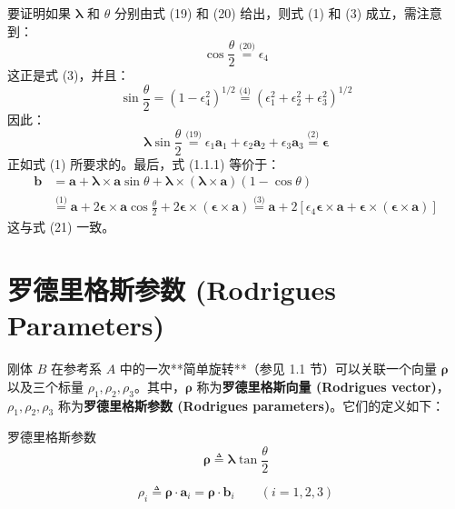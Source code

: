要证明如果 \(\boldsymbol{\lambda}\) 和 \(\theta\) 分别由式 (19) 和 (20) 给出，则式 (1) 和 (3) 成立，需注意到：
\begin{equation}
\cos\frac{\theta}{2} \overset{\text{(20)}}{=} \epsilon_4 \tag{30}
\end{equation}
这正是式 (3)，并且：
\begin{equation}
\sin\frac{\theta}{2} = (1 - \epsilon_4^2)^{1/2} \overset{\text{(4)}}{=} (\epsilon_1^2 + \epsilon_2^2 + \epsilon_3^2)^{1/2} \tag{31}
\end{equation}
因此：
\begin{equation}
\boldsymbol{\lambda} \sin\frac{\theta}{2} \overset{\text{(19)}}{=} \epsilon_1 \mathbf{a}_1 + \epsilon_2 \mathbf{a}_2 + \epsilon_3 \mathbf{a}_3 \overset{\text{(2)}}{=} \boldsymbol{\epsilon} \tag{32}
\end{equation}
正如式 (1) 所要求的。最后，式 (1.1.1) 等价于：
\begin{align}
\mathbf{b} &= \mathbf{a} + \boldsymbol{\lambda} \times \mathbf{a} \sin\theta + \boldsymbol{\lambda} \times (\boldsymbol{\lambda} \times \mathbf{a})(1 - \cos\theta) \nonumber \\
&\overset{\text{(1)}}{=} \mathbf{a} + 2\boldsymbol{\epsilon} \times \mathbf{a} \cos\frac{\theta}{2} + 2\boldsymbol{\epsilon} \times (\boldsymbol{\epsilon} \times \mathbf{a}) \overset{\text{(3)}}{=} \mathbf{a} + 2[\epsilon_4 \boldsymbol{\epsilon} \times \mathbf{a} + \boldsymbol{\epsilon} \times (\boldsymbol{\epsilon} \times \mathbf{a})] \tag{33}
\end{align}
这与式 (21) 一致。
\section{罗德里格斯参数 (Rodrigues Parameters)}

刚体 \(B\) 在参考系 \(A\) 中的一次**简单旋转**（参见 1.1 节）可以关联一个向量 \(\boldsymbol{\rho}\) 以及三个标量 \(\rho_1, \rho_2, \rho_3\)。其中，\(\boldsymbol{\rho}\) 称为\textbf{罗德里格斯向量 (Rodrigues vector)}，\(\rho_1, \rho_2, \rho_3\) 称为\textbf{罗德里格斯参数 (Rodrigues parameters)}。它们的定义如下：

\begin{mydefinition}{罗德里格斯参数}
\[
\boldsymbol{\rho} \triangleq \boldsymbol{\lambda} \tan \frac{\theta}{2}
\]
\end{mydefinition}
\begin{equation}
\rho_i \triangleq \boldsymbol{\rho} \cdot \mathbf{a}_i = \boldsymbol{\rho} \cdot \mathbf{b}_i \qquad (i = 1, 2, 3) \tag{2}
\end{equation}




